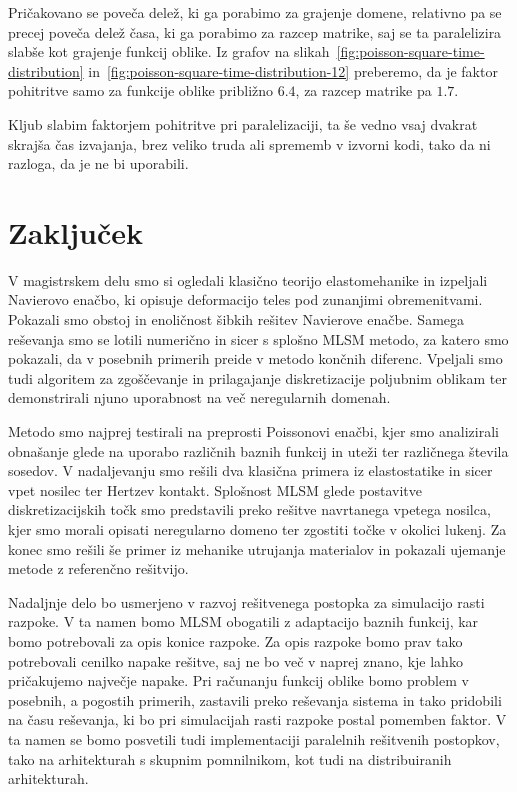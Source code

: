 \documentclass[12pt,a4paper,twoside]{article}
\theoremstyle{definition} %
\theoremstyle{plain} %
\numberwithin{equation}{section}
\let\oldsection\section
\def\section{\cleardoublepage\oldsection}
\begin{document}
Pričakovano se poveča delež, ki ga porabimo za grajenje domene, relativno pa se precej poveča delež
časa, ki ga porabimo za razcep matrike, saj se ta paralelizira slabše kot grajenje funkcij oblike.
Iz grafov na slikah~\ref{fig:poisson-square-time-distribution}
in~\ref{fig:poisson-square-time-distribution-12} preberemo, da je faktor pohitritve samo za funkcije
oblike približno $6.4$, za razcep matrike pa $1.7$.

Kljub slabim faktorjem pohitritve pri paralelizaciji, ta še vedno vsaj dvakrat skrajša čas izvajanja,
brez veliko truda ali sprememb v izvorni kodi, tako da ni razloga, da je ne bi uporabili.

\section{Zaključek}

V magistrskem delu smo si ogledali klasično teorijo elastomehanike in izpeljali Navierovo enačbo, ki
opisuje deformacijo teles pod zunanjimi obremenitvami. Pokazali smo obstoj in enoličnost šibkih
rešitev Navierove enačbe. Samega reševanja smo se lotili numerično in sicer s splošno MLSM metodo,
za katero smo pokazali, da v posebnih primerih preide v metodo končnih diferenc. Vpeljali smo tudi
algoritem za zgoščevanje in prilagajanje diskretizacije poljubnim oblikam ter demonstrirali njuno
uporabnost na več neregularnih domenah.

Metodo smo najprej testirali na preprosti Poissonovi enačbi, kjer smo analizirali obnašanje glede na
uporabo različnih baznih funkcij in uteži ter različnega števila sosedov. V nadaljevanju smo rešili
dva klasična primera iz elastostatike in sicer vpet nosilec ter Hertzev kontakt. Splošnost MLSM
glede postavitve diskretizacijskih točk smo predstavili preko rešitve navrtanega vpetega
nosilca, kjer smo morali opisati neregularno domeno ter zgostiti točke v okolici lukenj. Za konec
smo rešili še primer iz mehanike utrujanja materialov in pokazali ujemanje metode z referenčno
rešitvijo.

Nadaljnje delo bo usmerjeno v razvoj rešitvenega postopka za simulacijo rasti razpoke. V ta namen
bomo MLSM obogatili z adaptacijo baznih funkcij, kar bomo potrebovali za opis konice razpoke. Za
opis razpoke bomo prav tako potrebovali cenilko napake rešitve, saj ne bo več v naprej znano, kje
lahko pričakujemo največje napake. Pri računanju funkcij oblike bomo problem v posebnih, a pogostih
primerih, zastavili preko reševanja sistema in tako pridobili na času reševanja, ki bo pri
simulacijah rasti razpoke postal pomemben faktor. V ta namen se bomo posvetili tudi implementaciji
paralelnih rešitvenih postopkov, tako na arhitekturah s skupnim pomnilnikom, kot tudi na
distribuiranih arhitekturah.
\end{document}
